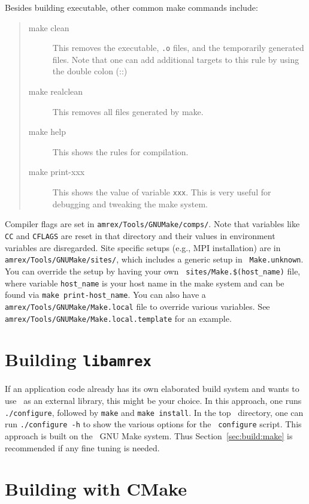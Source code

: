 Besides building executable, other common make commands include:
\begin{quote}
\begin{description}
  \item[make clean] This removes the executable, {\tt .o} files, and
    the temporarily generated files.  Note that one can add additional
    targets to this rule by using the double colon (::)
  \item[make realclean] This removes all files generated by make.
  \item[make help] This shows the rules for compilation.
  \item[make print-xxx] This shows the value of variable {\tt xxx}.  This is
    very useful for debugging and tweaking the make system.
\end{description}
\end{quote}

Compiler flags are set in {\tt amrex/Tools/GNUMake/comps/}.  Note that
variables like {\tt CC} and {\tt CFLAGS} are reset in that directory
and their values in environment variables are disregarded. Site
specific setups (e.g., MPI installation) are in {\tt
  amrex/Tools/GNUMake/sites/}, which includes a generic setup in {\tt
  Make.unknown}.  You can override the setup by having your own {\tt
  sites/Make.\$(host\_name)} file, where variable {\tt host\_name} is your
host name in the make system and can be found via {\tt make
  print-host\_name}.  You can also have a {\tt
  amrex/Tools/GNUMake/Make.local} file to override various variables.
See {\tt amrex/Tools/GNUMake/Make.local.template} for an example.

\section{Building {\tt libamrex}}
\label{sec:build:lib}

If an application code already has its own elaborated build system and
wants to use \amrex\ as an external library, this might be your
choice.  In this approach, one runs {\tt ./configure}, followed by
{\tt make} and {\tt make install}.  In the top \amrex\ directory, one
can run {\tt ./configure -h} to show the various options for the {\tt
  configure} script.  This approach is built on the \amrex\ GNU Make
system.  Thus Section~\ref{sec:build:make} is recommended if any fine
tuning is needed.

\section{Building with CMake}
\label{sec:build:cmake}


